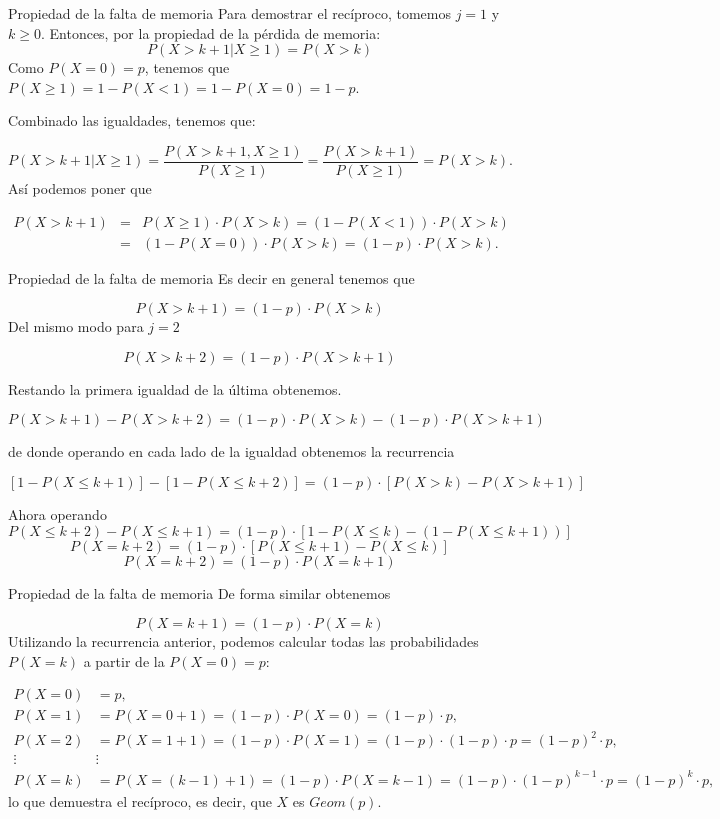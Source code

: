 \documentclass[
  ignorenonframetext,
  aspectratio=169]{beamer}
\begin{document}
\begin{frame}{Propiedad de la falta de memoria}
\protect\hypertarget{propiedad-de-la-falta-de-memoria-2}{}
Para demostrar el recíproco, tomemos \(j=1\) y \(k\geq 0\). Entonces,
por la propiedad de la pérdida de memoria: \[
P\left(X> k+1\big| X\geq 1\right)=P(X> k)
\] Como \(P(X=0)=p\), tenemos que
\(P(X \geq 1 )=1-P(X<1)=1-P(X=0)=1-p\).

Combinado las igualdades, tenemos que:

\[
P\left(X> k+1\big| X\geq 1\right)=\frac{P(X>k+1, X\geq 1)}{P(X\geq 1)}=\frac{P(X>k+1)}{P(X\geq 1)}=P(X>k).
\] Así podemos poner que

\begin{eqnarray*}
P(X>k+1)&=&P(X\geq 1)\cdot P(X>k)=\left(1-P(X<1)\right)\cdot P(X>k)\\
&=&\left(1-P(X=0)\right)\cdot P(X>k)=(1-p)\cdot P(X>k).
\end{eqnarray*}
\end{frame}

\begin{frame}{Propiedad de la falta de memoria}
\protect\hypertarget{propiedad-de-la-falta-de-memoria-3}{}
Es decir en general tenemos que

\[
P(X>k+1)=(1-p)\cdot P(X>k)
\] Del mismo modo para \(j=2\)

\[
P(X>k+2)=(1-p)\cdot P(X>k+1)
\]

Restando la primera igualdad de la última obtenemos.

\[
P(X>k+1)-P(X>k+2)=(1-p)\cdot P(X>k)-(1-p)\cdot P(X>k+1)
\]

de donde operando en cada lado de la igualdad obtenemos la recurrencia

\[
[1-P(X\leq k+1)]-[1-P(X\leq k+2)]=(1-p)\cdot [P(X>k)-P(X>k+1)]
\]

Ahora operando \[
P(X\leq k+2)-P(X\leq k+1)=(1-p)\cdot[1-P(X\leq k)-\left(1-P(X\leq k+1)\right)]
\] \[
P(X=k+2)=(1-p)\cdot[P(X\leq k+1)-P(X\leq k)]
\] \[
P(X=k+2)=(1-p)\cdot P(X=k+1)
\]
\end{frame}

\begin{frame}{Propiedad de la falta de memoria}
\protect\hypertarget{propiedad-de-la-falta-de-memoria-4}{}
De forma similar obtenemos

\[
P(X=k+1)=(1-p)\cdot P(X=k)
\] Utilizando la recurrencia anterior, podemos calcular todas las
probabilidades \(P(X=k)\) a partir de la \(P(X=0)=p\):

\[
\begin{array}{rl}
P(X=0)&= p,\\
P(X=1)&=P(X=0+1)= (1-p)\cdot P(X=0) =(1-p)\cdot  p,\\
P(X=2)&=P(X=1+1)= (1-p)\cdot P(X=1)=(1-p)\cdot (1-p)\cdot p=(1-p)^2\cdot p,\\
 \vdots& \vdots \\
P(X=k)&=P(X=(k-1)+1)= (1-p)\cdot P(X=k-1)=(1-p)\cdot (1-p)^{k-1}\cdot p=(1-p)^{k}\cdot p,
\end{array}
\] lo que demuestra el recíproco, es decir, que \(X\) es \(Geom(p)\).
\end{frame}
\end{document}
